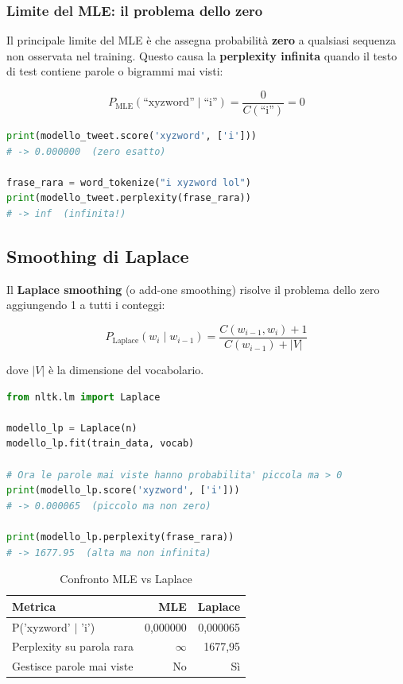 \documentclass[12pt, a4paper]{article}
\begin{document}
\subsubsection{Limite del MLE: il problema dello zero}

Il principale limite del MLE è che assegna probabilità \textbf{zero}
a qualsiasi sequenza non osservata nel training. Questo causa la
\textbf{perplexity infinita} quando il testo di test contiene parole
o bigrammi mai visti:

\begin{equation}
P_{\text{MLE}}(\text{``xyzword''} \mid \text{``i''}) = \frac{0}{C(\text{``i''})} = 0
\end{equation}

\begin{lstlisting}[language=Python, caption=Dimostrazione del problema dello zero]
print(modello_tweet.score('xyzword', ['i']))
# -> 0.000000  (zero esatto)

frase_rara = word_tokenize("i xyzword lol")
print(modello_tweet.perplexity(frase_rara))
# -> inf  (infinita!)
\end{lstlisting}

\subsection{Smoothing di Laplace}

Il \textbf{Laplace smoothing} (o add-one smoothing) risolve il problema
dello zero aggiungendo 1 a tutti i conteggi:

\begin{equation}
P_{\text{Laplace}}(w_i \mid w_{i-1}) =
\frac{C(w_{i-1}, w_i) + 1}{C(w_{i-1}) + |V|}
\end{equation}

dove $|V|$ è la dimensione del vocabolario.

\begin{lstlisting}[language=Python, caption=Addestramento modello Laplace]
from nltk.lm import Laplace

modello_lp = Laplace(n)
modello_lp.fit(train_data, vocab)

# Ora le parole mai viste hanno probabilita' piccola ma > 0
print(modello_lp.score('xyzword', ['i']))
# -> 0.000065  (piccolo ma non zero)

print(modello_lp.perplexity(frase_rara))
# -> 1677.95  (alta ma non infinita)
\end{lstlisting}

\begin{table}[H]
\centering
\begin{tabular}{lrr}
\toprule
\textbf{Metrica} & \textbf{MLE} & \textbf{Laplace} \\
\midrule
P('xyzword' $|$ 'i')          & 0,000000 & 0,000065 \\
Perplexity su parola rara     & $\infty$ & 1677,95 \\
Gestisce parole mai viste     & No       & Sì \\
\bottomrule
\end{tabular}
\caption{Confronto MLE vs Laplace}
\end{table}
\end{document}
